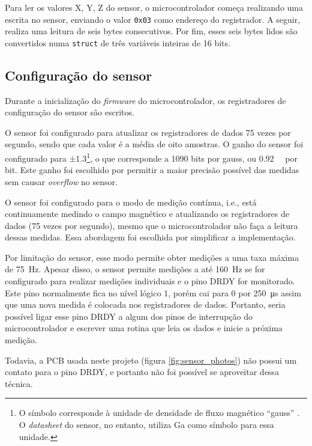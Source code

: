 \documentclass[brazil,pagestart=firstchapter]{abnt}
\makeatletter
\newcommand*{\ie}{i.e.\@\xspace}
\makeatother
\begin{document}
Para ler os valores X, Y, Z do sensor, o microcontrolador começa realizando
uma escrita no sensor, enviando o valor \texttt{0x03} como endereço do
registrador. A seguir, realiza uma leitura de seis bytes consecutivos. Por
fim, esses seis bytes lidos são convertidos numa \texttt{struct} de três
variáveis inteiras de 16 bits.

\subsection{Configuração do sensor}
\label{sub:software_sensor_config}

Durante a inicialização do \textit{firmware} do microcontrolador, os
registradores de configuração do sensor são escritos.

O sensor foi configurado para atualizar os registradores de dados 75 vezes
por segundo, sendo que cada valor é a média de oito amostras. O ganho do
sensor foi configurado para ±\SI{1.3}{\gauss}\footnote{
	O símbolo \si{\gauss} corresponde à unidade de densidade de fluxo
	magnético ``gauss'' \cite[p.~128]{SI}. O \textit{datasheet} do sensor,
	no entanto, utiliza Ga como símbolo para essa unidade.
}, o que corresponde a \num{1090} bits por gauss, ou \SI{0.92}{\milli\gauss}
por bit. Este ganho foi escolhido por permitir a maior precisão possível das
medidas sem causar \textit{overflow} no sensor.

O sensor foi configurado para o modo de medição contínua, \ie, está
continuamente medindo o campo magnético e atualizando os registradores de
dados (75 vezes por segundo), mesmo que o microcontrolador não faça a
leitura dessas medidas. Essa abordagem foi escolhida por simplificar a
implementação.

Por limitação do sensor, esse modo permite obter medições a uma taxa máxima
de \SI{75}{\hertz}. Apesar disso, o sensor permite medições a até
\SI{160}{\hertz} se for configurado para realizar medições individuais e o
pino DRDY for monitorado. \cite[p.~12]{HMC5883L} Este pino normalmente fica
no nível lógico 1, porém cai para 0 por \SI{250}{\micro\second} assim que
uma nova medida é colocada nos registradores de dados. \cite[p.~3]{HMC5883L}
Portanto, seria possível ligar esse pino DRDY a algum dos pinos de
interrupção do microcontrolador e escrever uma rotina que leia os dados e
inicie a próxima medição.

Todavia, a \ac{PCB} usada neste projeto (figura \ref{fig:sensor_photos}) não
possui um contato para o pino DRDY, e portanto não foi possível se
aproveitar dessa técnica.
\end{document}
